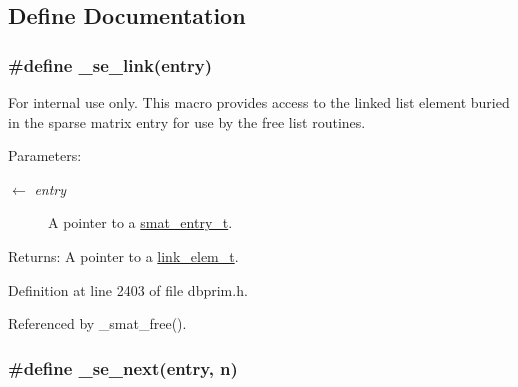 \subsection{Define Documentation}
\hypertarget{group__dbprim__smat_ga57}{
\subsubsection[\_\-se\_\-link]{\setlength{\rightskip}{0pt plus 5cm}\#define \_\-se\_\-link(entry)}}
\label{group__dbprim__smat_ga57}


\begin{Desc}
\item[For internal use only.]
This macro provides access to the linked list element buried in the sparse matrix entry for use by the free list routines.

\begin{Desc}
\item[Parameters:]
\begin{description}
\item[\mbox{$\leftarrow$} {\em entry}]A pointer to a \hyperlink{group__dbprim__smat_ga2}{smat\_\-entry\_\-t}.\end{description}
\end{Desc}
\begin{Desc}
\item[Returns:]A pointer to a \hyperlink{group__dbprim__link_ga1}{link\_\-elem\_\-t}.\end{Desc}
\end{Desc}


Definition at line 2403 of file dbprim.h.

Referenced by \_\-smat\_\-free().\hypertarget{group__dbprim__smat_ga60}{
\subsubsection[\_\-se\_\-next]{\setlength{\rightskip}{0pt plus 5cm}\#define \_\-se\_\-next(entry, n)}}
\label{group__dbprim__smat_ga60}


